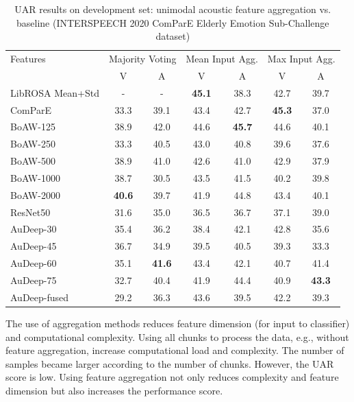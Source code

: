 \begin{table}
\caption{UAR results on development set: unimodal acoustic feature aggregation
vs. baseline \cite{Schuller} (INTERSPEECH 2020 ComParE Elderly Emotion
Sub-Challenge dataset)}
    \label{tab:acoustic_aggregation}
    \begin{center}
    \begin{tabular}{l c c c c c c}
    \hline 
Features  & \multicolumn{2}{c}{Majority Voting \cite{Schuller} } &
\multicolumn{2}{c}{Mean Input Agg.}      & \multicolumn{2}{c}{Max Input Agg.}
\\
& V & A & V & A & V & A \\   
\hline \hline
LibROSA Mean+Std  & - & - & \textbf{45.1}  & 38.3  & 42.7 & 39.7 \\
ComParE & 33.3  &   39.1  & 43.4  & 42.7  & \textbf{45.3} & 37.0 \\
BoAW-125  & 38.9  &   42.0& 44.6 & \textbf{45.7} & 44.6  & 40.1 \\
BoAW-250  & 33.3  & 40.5  & 43.0  & 40.8  & 39.6  & 37.6 \\
BoAW-500  & 38.9  & 41.0  & 42.6  & 41.0  & 42.9  & 37.9 \\
BoAW-1000 & 38.7  & 30.5  & 43.5  & 41.5  & 40.2  & 39.8 \\
BoAW-2000 & \textbf{40.6}  & 39.7  & 41.9  & 44.8  & 43.4  & 40.1 \\
ResNet50  & 31.6  & 35.0  & 36.5  & 36.7  & 37.1  & 39.0 \\
AuDeep-30 & 35.4  & 36.2  & 38.4  & 42.1  & 42.8  & 35.6 \\
AuDeep-45 & 36.7  & 34.9  & 39.5  & 40.5  & 39.3  & 33.3 \\
AuDeep-60 & 35.1  & \textbf{41.6}  & 43.4  & 42.1  & 40.7  & 41.4 \\
AuDeep-75 & 32.7  & 40.4  & 41.9  & 44.4  & 40.9  & \textbf{43.3} \\
AuDeep-fused  & 29.2  & 36.3  & 43.6  & 39.5  & 42.2  & 39.3 \\
    \hline
    \end{tabular}
  \end{center}
  \end{table}

The use of aggregation methods reduces feature dimension (for input to
classifier) and computational complexity. Using all chunks to process the data,
e.g., without feature aggregation, increase computational load and complexity.
The number of samples became larger according to the number of chunks. However,
the UAR score is low. Using feature aggregation not only reduces complexity and
feature dimension but also increases the performance score.

